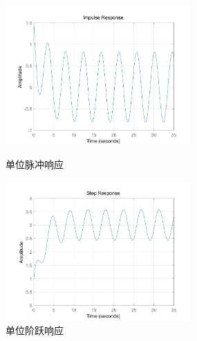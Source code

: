 \documentclass[UTF8]{ctexart}
\begin{document}
\par \begin{figure} [h]  
\begin{minipage}[t]{0.5\linewidth}  
\centering  
\includegraphics[width=2.8in]{fig/2-1.jpg}  
\caption{单位脉冲响应}  
\label{fig:side:a}  
\end{minipage}%
\begin{minipage}[t]{0.5\linewidth}  
\centering  
\includegraphics[width=2.8in]{fig/2-2.jpg}  
\caption{单位阶跃响应}  
\label{fig:side:b}  
\end{minipage}  
\end{figure} 
\end{document}
